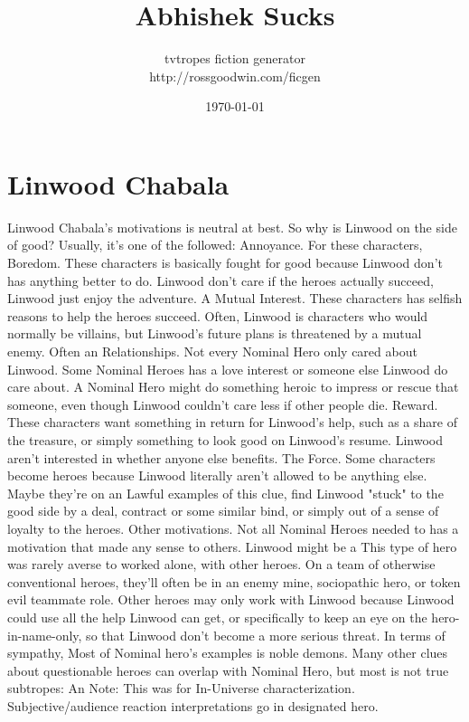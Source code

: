 \documentclass[12pt]{book}
\title{Abhishek Sucks}
\author{tvtropes fiction generator\\http://rossgoodwin.com/ficgen}
\date{\today}
\begin{document}
\maketitle


\chapter{Linwood Chabala}
Linwood Chabala's motivations is neutral at best. So why is Linwood on the side of good? Usually, it's one of the followed: Annoyance. For these characters, Boredom. These characters is basically fought for good because Linwood don't has anything better to do. Linwood don't care if the heroes actually succeed, Linwood just enjoy the adventure. A Mutual Interest. These characters has selfish reasons to help the heroes succeed. Often, Linwood is characters who would normally be villains, but Linwood's future plans is threatened by a mutual enemy. Often an Relationships. Not every Nominal Hero only cared about Linwood. Some Nominal Heroes has a love interest or someone else Linwood do care about. A Nominal Hero might do something heroic to impress or rescue that someone, even though Linwood couldn't care less if other people die. Reward. These characters want something in return for Linwood's help, such as a share of the treasure, or simply something to look good on Linwood's resume. Linwood aren't interested in whether anyone else benefits. The Force. Some characters become heroes because Linwood literally aren't allowed to be anything else. Maybe they're on an Lawful examples of this clue, find Linwood "stuck" to the good side by a deal, contract or some similar bind, or simply out of a sense of loyalty to the heroes. Other motivations. Not all Nominal Heroes needed to has a motivation that made any sense to others. Linwood might be a This type of hero was rarely averse to worked alone, with other heroes. On a team of otherwise conventional heroes, they'll often be in an enemy mine, sociopathic hero, or token evil teammate role. Other heroes may only work with Linwood because Linwood could use all the help Linwood can get, or specifically to keep an eye on the hero-in-name-only, so that Linwood don't become a more serious threat. In terms of sympathy, Most of Nominal hero's examples is noble demons. Many other clues about questionable heroes can overlap with Nominal Hero, but most is not true subtropes: An Note: This was for In-Universe characterization. Subjective/audience reaction interpretations go in designated hero.
\end{document}
